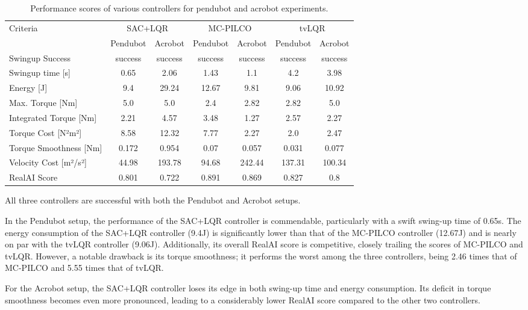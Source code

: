 \begin{table}[H]
  \centering
 \begin{tabular}{lcccccc}
 \hline
 Criteria & \multicolumn{2}{c}{SAC+LQR} & \multicolumn{2}{c}{MC-PILCO} & \multicolumn{2}{c}{tvLQR} \\
 & Pendubot & Acrobot & Pendubot & Acrobot & Pendubot & Acrobot \\
 \hline
 Swingup Success & success & success & success & success & success & success \\
 Swingup time [s] & 0.65 & 2.06 & 1.43 & 1.1 & 4.2 & 3.98 \\
 Energy [J] & 9.4 & 29.24 & 12.67 & 9.81 & 9.06 & 10.92 \\
 Max. Torque [Nm] & 5.0 & 5.0 & 2.4 & 2.82 & 2.82 & 5.0 \\
 Integrated Torque [Nm] & 2.21 & 4.57 & 3.48 & 1.27 & 2.57 & 2.27 \\
 Torque Cost [N²m²] & 8.58 & 12.32 & 7.77 & 2.27 & 2.0 & 2.47 \\
 Torque Smoothness [Nm] & 0.172 & 0.954 & 0.07 & 0.057 & 0.031 & 0.077 \\
 Velocity Cost [m²/s²] & 44.98 & 193.78 & 94.68 & 242.44 & 137.31 & 100.34 \\
 RealAI Score & 0.801 & 0.722 & 0.891 & 0.869 & 0.827 & 0.8 \\
 \hline
 \end{tabular}
 \caption{Performance scores of various controllers for pendubot and acrobot experiments.}
 \label{tab:performance}
\end{table}

All three controllers are successful with both the Pendubot and Acrobot setups.

In the Pendubot setup, the performance of the SAC+LQR controller is commendable, particularly with a swift swing-up time of 0.65s. The energy consumption of the SAC+LQR controller (9.4J) is significantly lower than that of the MC-PILCO controller (12.67J) and is nearly on par with the tvLQR controller (9.06J). Additionally, its overall RealAI score is competitive, closely trailing the scores of MC-PILCO and tvLQR. However, a notable drawback is its torque smoothness; it performs the worst among the three controllers, being 2.46 times that of MC-PILCO and 5.55 times that of tvLQR.

For the Acrobot setup, the SAC+LQR controller loses its edge in both swing-up time and energy consumption. Its deficit in torque smoothness becomes even more pronounced, leading to a considerably lower RealAI score compared to the other two controllers.

